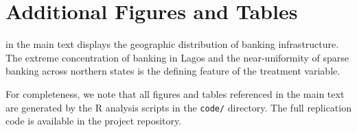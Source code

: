 \documentclass[12pt]{article}
\begin{document}
\section{Additional Figures and Tables}
\label{app:additional}

 in the main text displays the geographic distribution of banking infrastructure. The extreme concentration of banking in Lagos and the near-uniformity of sparse banking across northern states is the defining feature of the treatment variable.

For completeness, we note that all figures and tables referenced in the main text are generated by the R analysis scripts in the \texttt{code/} directory. The full replication code is available in the project repository.
\end{document}
